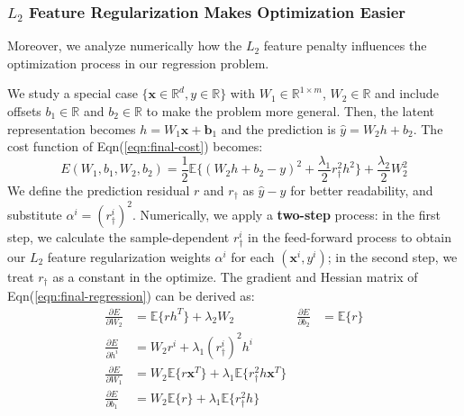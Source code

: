 \subsubsection{$L_2$ Feature Regularization Makes Optimization Easier}
Moreover, we analyze numerically how the $L_2$ feature penalty influences the optimization process in our regression problem. %

We study a special case $\{\mathbf{x}\in\mathbb{R}^d,y\in\mathbb{R}\}$ with $W_1\in\mathbb{R}^{1\times m}$, $W_2\in\mathbb{R}$ and include offsets $b_1\in\mathbb{R}$ and $b_2\in\mathbb{R}$ to make the problem more general. Then, the latent representation becomes $h=W_1\mathbf{x}+\mathbf{b}_1$ and the prediction is $\hat{y}=W_2h+b_2$. The cost function of Eqn(\ref{eqn:final-cost}) becomes:
\begin{equation}
E(W_1,b_1,W_2,b_2)=\frac{1}{2}\mathbb{E}\{(W_2h+b_2-y)^2+\frac{\lambda_1}{2} r_{\dagger}^2h^2\}+\frac{\lambda_2}{2}W_2^2
\label{eqn:final-regression}
\end{equation}
We define the prediction residual $r$ and $r_{\dagger}$ as $\hat{y}-y$ for better readability, and substitute $\alpha^i=(r^i_{\dagger})^2$. 
Numerically, we apply a \textbf{two-step} process: in the first step, we calculate the sample-dependent $r^i_{\dagger}$ in the feed-forward process to obtain our $L_2$ feature regularization weights $\alpha^i$ for each $(\mathbf{x}^i,y^i)$; in the second step, we treat $r_{\dagger}$ as a constant in the  optimize. 
The gradient and Hessian matrix of Eqn(\ref{eqn:final-regression}) can be derived as:
\begin{align*}
\frac{\partial E}{\partial W_2}&=\mathbb{E}\{rh^T\}+\lambda_2W_2 
&\frac{\partial E}{\partial b_2}&=\mathbb{E}\{r\}\\
\frac{\partial E}{\partial h^i}&=W_2r^i+\lambda_1(r^i_{\dagger})^2h^i\\
\frac{\partial E}{\partial W_1}&=W_2\mathbb{E}\{r\mathbf{x}^T\}+\lambda_1 \mathbb{E}\{r_{\dagger}^2h\mathbf{x}^T\}\\
\frac{\partial E}{\partial b_1}&=W_2\mathbb{E}\{r\}+\lambda_1 \mathbb{E}\{r_{\dagger}^2h\}
\end{align*}

